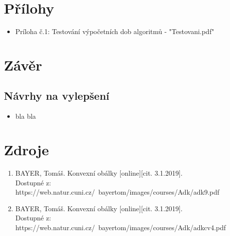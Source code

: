 \documentclass[a4paper, 12pt]{article}
\begin{document}
\clearpage

\section{Přílohy}

\begin{itemize}
	\item Príloha č.1: Testování výpočetních dob algoritmů - "Testovani.pdf"
\end{itemize}
\clearpage
\section{Závěr}

\subsection{Návrhy na vylepšení}

\begin{itemize}
\item bla bla
\end{itemize}

\clearpage
\section{Zdroje}

\begin{enumerate}
\item  BAYER, Tomáš. Konvexní obálky [online][cit. 3.1.2019]. \\
Dostupné z: https://web.natur.cuni.cz/~bayertom/images/courses/Adk/adk9.pdf  \\

\item  BAYER, Tomáš. Konvexní obálky [online][cit. 3.1.2019]. \\
Dostupné z: https://web.natur.cuni.cz/~bayertom/images/courses/Adk/adkcv4.pdf\\
\end{enumerate}
\end{document}
